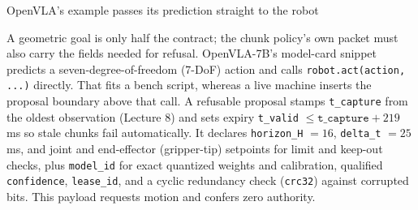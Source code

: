 \documentclass[aspectratio=169, 12pt]{beamer}
\begin{document}
\begin{frame}{OpenVLA's example passes its prediction straight to the robot}
{  A geometric goal is only half the contract; the chunk policy's own packet must also carry the fields needed for refusal. OpenVLA-7B's model-card snippet predicts a seven-degree-of-freedom (7-DoF) action and calls \texttt{robot.act(action, ...)} directly. That fits a bench script, whereas a live machine inserts the proposal boundary above that call. A refusable proposal stamps \texttt{t\_capture} from the oldest observation (Lecture 8) and sets expiry \texttt{t\_valid} $\le \texttt{t\_capture} + 219$ ms so stale chunks fail automatically. It declares \texttt{horizon\_H} $= 16$, \texttt{delta\_t} $= 25$ ms, and joint and end-effector (gripper-tip) setpoints for limit and keep-out checks, plus \texttt{model\_id} for exact quantized weights and calibration, qualified \texttt{confidence}, \texttt{lease\_id}, and a cyclic redundancy check (\texttt{crc32}) against corrupted bits. This payload requests motion and confers zero authority.


}
\end{frame}
\end{document}
